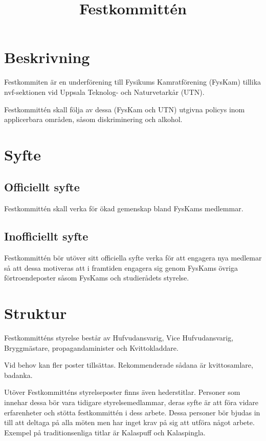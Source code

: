 \documentclass{../resources/dgovdoc}
\title{Festkommittén}
\begin{document}
\maketitle

\section{Beskrivning}

Festkommiten är en underförening till Fysikums Kamratförening (FysKam) tillika nvf-sektionen vid Uppsala Teknolog- och Naturvetarkår (UTN).

Festkommittén skall följa av dessa (FysKam och UTN) utgivna policys inom applicerbara områden, såsom diskriminering och alkohol.


\section{Syfte}

\subsection{Officiellt syfte}

Festkommittén skall verka för ökad gemenskap bland FysKams medlemmar.

\subsection{Inofficiellt syfte}

Festkommittén bör utöver sitt officiella syfte verka för att engagera nya medlemar så att dessa motiveras att i framtiden engagera sig genom FysKams övriga förtroendeposter såsom FysKams och studierådets styrelse.

\section{Struktur}

Festkommitténs styrelse består av Hufvudansvarig, Vice Hufvudansvarig, Bryggmästare, propagandaminister och Kvittokladdare.

Vid behov kan fler poster tillsättas. Rekommenderade sådana är kvittosamlare, badanka.

Utöver Festkommitténs styrelseposter finns även hederstitlar. Personer som innehar dessa bör vara tidigare styrelsemedlammar, deras syfte är att föra vidare erfarenheter och stötta festkommittén i dess arbete. Dessa personer bör bjudas in till att deltaga på alla möten men har inget krav på sig att utföra något arbete. Exempel på traditionsenliga titlar är Kalaspuff och Kalaspingla.
\end{document}
